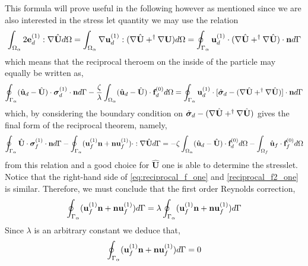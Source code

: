 This formula will prove useful in the following however as mentioned since we are also interested in the stress let quantity we may use the relation 
\begin{align*}
    \int_{\Omega_{\alpha}}  2\textbf{e}_d^{(1)} : \mathbf{\nabla} \hat{\textbf{U}}  d\Omega
    &=\int_{\Omega_{\alpha}}  \mathbf{\nabla} \textbf{u}_d^{(1)} : (\mathbf{\nabla} \hat{\textbf{U}} +^\dagger \mathbf{\nabla} \textbf{U})  d\Omega
    =
    \oint_{\Gamma_{\alpha}}   \textbf{u}_d^{(1)} \cdot (\mathbf{\nabla} \hat{\textbf{U}} + ^\dagger\mathbf{\nabla} \hat{\textbf{U}})  \cdot \textbf{n} d\Gamma\\
\end{align*}
which means that the reciprocal theroem on the inside of the particle may equally be written as, 
\begin{equation*}
    \oint_{\Gamma_{\alpha}}  (\hat{\textbf{u}}_d - \hat{\textbf{U}})\cdot \bm\sigma_d^{(1)} \cdot \textbf{n} d\Gamma
    - \frac{\zeta}{\lambda} \int_{\Omega_{\alpha}} (\hat{\textbf{u}}_d - \hat{\textbf{U}}) \cdot \textbf{f}_d^{(0)} d\Omega
    =
    \oint_{\Gamma_{\alpha}} 
         \textbf{u}_d^{(1)}\cdot[\hat{\bm\sigma}_d  - (\mathbf{\nabla} \hat{\textbf{U}} + ^\dagger\mathbf{\nabla} \hat{\textbf{U}})]\cdot \textbf{n}
     d\Gamma
\end{equation*}
which, by considering the boundary condition on $\hat{\bm\sigma}_d  - (\mathbf{\nabla} \hat{\textbf{U}} + ^\dagger\mathbf{\nabla} \hat{\textbf{U}})$ gives the final form of the reciprocal theorem, namely, 
\begin{equation*}
    \intS{\hat{\textbf{U}}\cdot  \bm\sigma_f^{(1)} \cdot \textbf{n}}
    - \intS{(\textbf{u}_f^{(1)} \textbf{n} + \textbf{n} \textbf{u}_f^{(1)})\cdot :\grad \hat{\textbf{U}} }
    = 
    - \zeta \intO{(\hat{\textbf{u}}_d - \hat{\textbf{U}}) \cdot \textbf{f}_d^{(0)}}
    - \intOf{\hat{\textbf{u}}_f\cdot  \textbf{f}^{(0)}_f}
    \label{eq:reciprocal_f2_one}
\end{equation*}
from this relation and a good choice for $\hat{\textbf{U}}$ one is able to determine the stresslet. 
Notice that the right-hand side of \ref{eq:reciprocal_f_one} and \ref{reciprocal_f2_one} is similar. 
Therefore, we must conclude that the first order Reynolds correction,
\begin{equation*}
    \oint_{\Gamma_{\alpha}} (\textbf{u}_f^{(1)} \textbf{n} + \textbf{n} \textbf{u}_f^{(1)}) d\Gamma
    = \lambda \oint_{\Gamma_{\alpha}} (\textbf{u}_f^{(1)} \textbf{n} + \textbf{n} \textbf{u}_f^{(1)}) d\Gamma
\end{equation*}
Since $\lambda$ is an arbitrary constant we deduce that, 
\begin{equation*}
    \oint_{\Gamma_{\alpha}} (\textbf{u}_f^{(1)} \textbf{n} + \textbf{n} \textbf{u}_f^{(1)}) d\Gamma= 0
\end{equation*}

